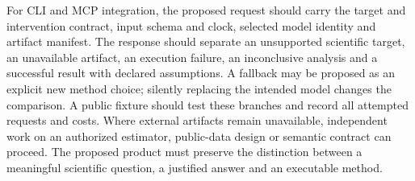 For CLI and MCP integration, the proposed request should carry the target and intervention contract, input schema and clock, selected model identity and artifact manifest. The response should separate an unsupported scientific target, an unavailable artifact, an execution failure, an inconclusive analysis and a successful result with declared assumptions. A fallback may be proposed as an explicit new method choice; silently replacing the intended model changes the comparison. A public fixture should test these branches and record all attempted requests and costs. Where external artifacts remain unavailable, independent work on an authorized estimator, public-data design or semantic contract can proceed. The proposed product must preserve the distinction between a meaningful scientific question, a justified answer and an executable method.

